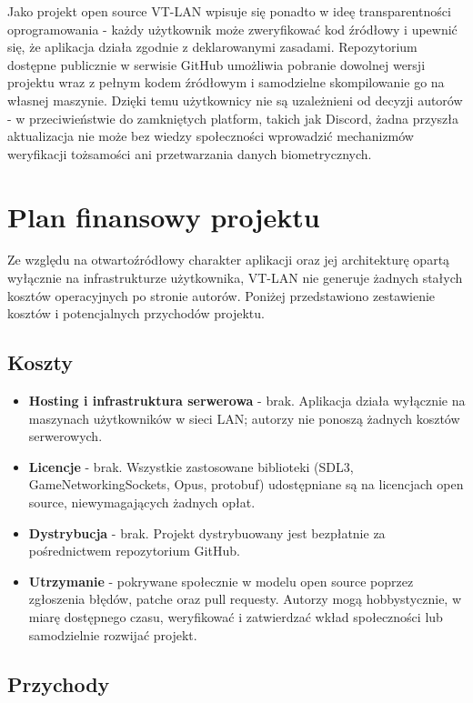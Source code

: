Jako projekt open source VT-LAN wpisuje się ponadto w ideę transparentności
oprogramowania - każdy użytkownik może zweryfikować kod źródłowy i upewnić
się, że aplikacja działa zgodnie z deklarowanymi zasadami. Repozytorium
dostępne publicznie w serwisie GitHub umożliwia pobranie dowolnej wersji
projektu wraz z pełnym kodem źródłowym i samodzielne skompilowanie go na
własnej maszynie. Dzięki temu użytkownicy nie są uzależnieni od decyzji
autorów - w przeciwieństwie do zamkniętych platform, takich jak Discord,
żadna przyszła aktualizacja nie może bez wiedzy społeczności wprowadzić
mechanizmów weryfikacji tożsamości ani przetwarzania danych biometrycznych.

\section{Plan finansowy projektu}

Ze względu na otwartoźródłowy charakter aplikacji oraz jej architekturę
opartą wyłącznie na infrastrukturze użytkownika, VT-LAN nie generuje
żadnych stałych kosztów operacyjnych po stronie autorów. Poniżej
przedstawiono zestawienie kosztów i potencjalnych przychodów projektu.

\subsection*{Koszty}

\begin{itemize}
	\item \textbf{Hosting i infrastruktura serwerowa} - brak. Aplikacja
	działa wyłącznie na maszynach użytkowników w sieci LAN; autorzy nie
	ponoszą żadnych kosztów serwerowych.
	\item \textbf{Licencje} - brak. Wszystkie zastosowane biblioteki
	(SDL3, GameNetworkingSockets, Opus, protobuf) udostępniane są na
	licencjach open source, niewymagających żadnych opłat.
	\item \textbf{Dystrybucja} - brak. Projekt dystrybuowany jest
	bezpłatnie za pośrednictwem repozytorium GitHub.
	\item \textbf{Utrzymanie} - pokrywane społecznie w modelu open source
	poprzez zgłoszenia błędów, patche oraz pull requesty. Autorzy mogą
	hobbystycznie, w miarę dostępnego czasu, weryfikować i zatwierdzać
	wkład społeczności lub samodzielnie rozwijać projekt.
\end{itemize}

\subsection*{Przychody}

